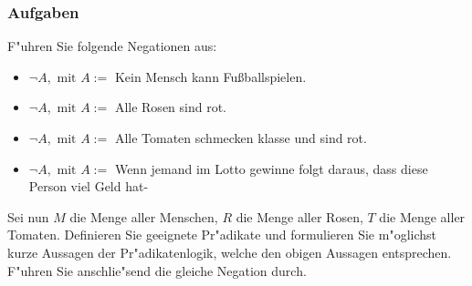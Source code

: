 \subsubsection{Aufgaben}
F"uhren Sie folgende Negationen aus:
\begin{itemize}
	\item $\neg A, \text{ mit } A:= $ Kein Mensch kann Fu{\ss}ballspielen.
	\item $\neg A, \text{ mit } A := $ Alle Rosen sind rot.
	\item $\neg A, \text{ mit } A := $ Alle Tomaten schmecken klasse und sind rot.
	\item $\neg A, \text{ mit } A := $ Wenn jemand im Lotto gewinne folgt daraus, dass diese Person viel Geld hat-
\end{itemize}
Sei nun $M$ die Menge aller Menschen, $R$ die Menge aller Rosen, $T$ die Menge aller Tomaten. Definieren Sie geeignete Pr"adikate und formulieren Sie m"oglichst kurze Aussagen der Pr"adikatenlogik, welche den obigen Aussagen entsprechen. F"uhren Sie anschlie"send die gleiche Negation durch.